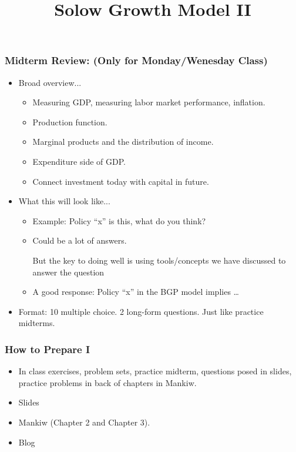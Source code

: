 \documentclass[9pt]{beamer}
\title[NYU Stern] %
{\huge Solow Growth Model II}
\author[Michael Waugh] %
{\bf{\Large}}%
\date[] %
\begin{document}



\begin{frame}[t]
\frametitle{Midterm Review: (Only for Monday/Wenesday Class)}
\begin{itemize}
\item Broad overview...
\begin{itemize}
\medskip
\item Measuring GDP, measuring labor market performance, inflation.
\medskip
\item Production function.
\medskip
\item Marginal products and the distribution of income.
\medskip
\item Expenditure side of GDP.
\medskip
\item Connect investment today with capital in future. 
\end{itemize}
\bigskip
\item What this will look like...
\begin{itemize}
\medskip
\item Example: Policy ``x'' is this, what do you think?
\medskip
\item Could be a lot of answers. \begin{alertenv}{But the key to doing well is using tools/concepts we have discussed to answer the question}\end{alertenv}
\medskip
\item A good response: Policy ``x'' in the BGP model implies \ldots
\end{itemize}
\medskip
\item Format: 10 multiple choice. 2 long-form questions. Just like practice midterms.
\end{itemize}
\bigskip
\end{frame}



\begin{frame}[t]
\frametitle{How to Prepare I}
\begin{itemize}
\item In class exercises, problem sets, practice midterm, questions posed in slides, practice problems in back of chapters in Mankiw.
\medskip
\item Slides
\medskip
\item Mankiw (Chapter 2 and Chapter 3).
\medskip
\item Blog
\end{itemize}
\end{frame}
\end{document}
